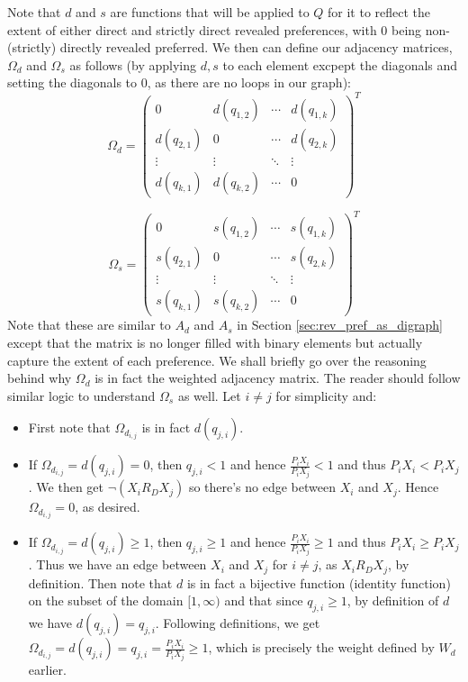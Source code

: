 \documentclass{article} %
\theoremstyle{style1}
\theoremstyle{style1}
\theoremstyle{example}
\begin{document}
Note that $d$ and $s$ are functions that will be applied to $Q$ for it to reflect the extent of either direct and strictly direct revealed preferences, with 0 being non-(strictly) directly revealed preferred. We then can define our adjacency matrices, $\Omega_d$ and $\Omega_s$ as follows (by applying $d,s$ to each element excpept the diagonals and setting the diagonals to 0, as there are no loops in our graph):
\[
\Omega_d =
  \begin{pmatrix}
  0 & d(q_{1,2}) & \cdots & d(q_{1,k}) \\
    d(q_{2,1}) & 0 & \cdots & d(q_{2,k}) \\
    \vdots & \vdots & \ddots & \vdots \\
    d(q_{k,1}) & d(q_{k,2}) & \cdots & 0
  \end{pmatrix}^T
\]

\[
\Omega_s =
  \begin{pmatrix}
  0 & s(q_{1,2}) & \cdots & s(q_{1,k}) \\
    s(q_{2,1}) & 0 & \cdots & s(q_{2,k}) \\
    \vdots & \vdots & \ddots & \vdots \\
    s(q_{k,1}) & s(q_{k,2}) & \cdots & 0
  \end{pmatrix} ^T
\]
Note that these are similar to $A_d$ and $A_s$ in Section \ref{sec:rev_pref_as_digraph} except that the matrix is no longer filled with binary elements but actually capture the extent of each preference. We shall briefly go over the reasoning behind why $\Omega_d$ is in fact the weighted adjacency matrix. The reader should follow similar logic to understand $\Omega_s$ as well. Let $i\not=j$ for simplicity and:
\begin{itemize}
  \item First note that $\Omega_{d_{i,j}}$ is in fact $d(q_{j,i})$.
  \item If $\Omega_{d_{i,j}}=d(q_{j,i})=0$, then $q_{j,i}<1$ and hence $\frac{P_iX_i}{P_iX_j}<1$ and thus $P_iX_i<P_iX_j$. We then get $\neg(X_i R_D X_j)$ so there's no edge between $X_i$ and $X_j$. Hence $\Omega_{d_{i,j}}=0$, as desired.
  \item If $\Omega_{d_{i,j}}=d(q_{j,i})\geq1$, then $q_{j,i}\geq1$ and hence $\frac{P_iX_i}{P_iX_j}\geq1$ and thus $P_iX_i\geq P_iX_j$. Thus we have an edge between $X_i$ and $X_j$ for $i\not=j$, as $X_iR_D X_j$, by definition. Then note that $d$ is in fact a bijective function (identity function) on the subset of the domain $[1,\infty)$ and that since $q_{j,i}\geq1$, by definition of $d$ we have $d(q_{j,i})=q_{j,i}$. Following definitions, we get $\Omega_{d_{i,j}}=d(q_{j,i})=q_{j,i}=\frac{P_iX_i}{P_iX_j}\geq1$, which is precisely the weight defined by $W_d$ earlier.
\end{itemize}
\end{document}
